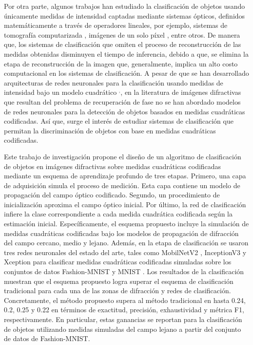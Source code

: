 Por otra parte, algunos trabajos han estudiado la clasificación de objetos usando únicamente medidas de intensidad captadas mediante sistemas ópticos, definidos matemáticamente a través de operadores lineales, por ejemplo, sistemas de tomografía computarizada , imágenes de un solo píxel , entre otros. De manera que, los sistemas de clasificación que omiten el proceso de reconstrucción de las medidas obtenidas disminuyen el tiempo de inferencia, debido a que, se elimina la etapa de reconstrucción de la imagen que, generalmente, implica un alto costo computacional en los sistemas de clasificación. A pesar de que se han desarrollado arquitecturas de redes neuronales para la clasificación usando medidas de intensidad bajo un modelo cuadrático $^,$, en la literatura de imágenes difractivas que resultan del problema de recuperación de fase no se han abordado modelos de redes neuronales para la detección de objetos basados en medidas cuadráticas codificadas. Así que, surge el interés de estudiar sistemas de clasificación que permitan la discriminación de objetos con base en medidas cuadráticas codificadas.

Este trabajo de investigación propone el diseño de un algoritmo de clasificación de objetos en imágenes difractivas sobre medidas cuadráticas codificadas mediante un esquema de aprendizaje profundo de tres etapas. Primero, una capa de adquisición simula el proceso de medición. Esta capa contiene un modelo de propagación del campo óptico codificado. Segundo, un procedimiento de inicialización aproxima el campo óptico inicial. Por último, la red de clasificación infiere la clase correspondiente a cada medida cuadrática codificada según la estimación inicial. Específicamente, el esquema propuesto incluye la simulación de medidas cuadráticas codificadas bajo los modelos de propagación de difracción del campo cercano, medio y lejano. Además, en la etapa de clasificación se usaron tres redes neuronales del estado del arte, tales como MobilNetV2 , InceptionV3  y Xception  para clasificar medidas cuadráticas codificadas simuladas sobre los conjuntos de datos Fashion-MNIST  y MNIST . Los resultados de la clasificación muestran que el esquema propuesto logra superar el esquema de clasificación tradicional para cada una de las zonas de difracción y redes de clasificación. Concretamente, el método propuesto supera al método tradicional en hasta 0.24, 0.2, 0.25 y 0.22 en términos de exactitud, precisión, exhaustividad y métrica F1, respectivamente. En particular, estas ganancias se reportan para la clasificación de objetos utilizando medidas simuladas del campo lejano a partir del conjunto de datos de Fashion-MNIST.

